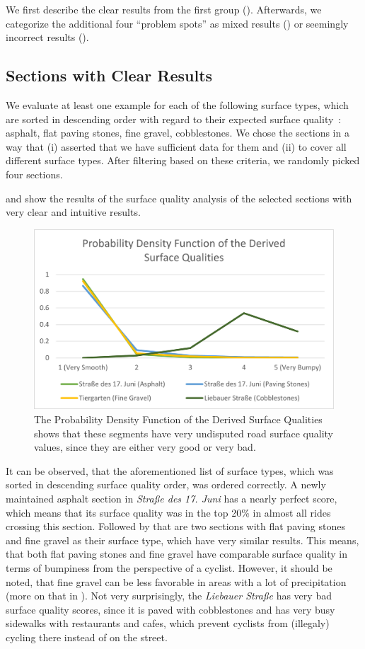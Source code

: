 We first describe the clear results from the first group ().
Afterwards, we categorize the additional four ``problem spots'' as mixed results () or seemingly incorrect results ().


\subsection{Sections with Clear Results}
\label{subsec:sections_with_clear_results}
We evaluate at least one example for each of the following surface types, which are sorted in descending order with regard to their expected surface quality~\cite{titov2019monitoring}: asphalt, flat paving stones, fine gravel, cobblestones.
We chose the sections in a way that (i) asserted that we have sufficient data for them and (ii) to cover all different surface types.
After filtering based on these criteria, we randomly picked four sections.

 and  show the results of the surface quality analysis of the selected sections with very clear and intuitive results.

\begin{figure}
    \centering
    \includegraphics[width=0.7\columnwidth]{fig/pdf_clear.png}
    \caption{%
        The Probability Density Function of the Derived Surface Qualities shows that these segments have very undisputed road surface quality values, since they are either very good or very bad.
    }%
    \label{fig:clear}
\end{figure}

It can be observed, that the aforementioned list of surface types, which was sorted in descending surface quality order, was ordered correctly.
A newly maintained asphalt section in \textit{Straße des 17. Juni} has a nearly perfect score, which means that its surface quality was in the top 20\% in almost all rides crossing this section.
Followed by that are two sections with flat paving stones and fine gravel as their surface type, which have very similar results.
This means, that both flat paving stones and fine gravel have comparable surface quality in terms of bumpiness from the perspective of a cyclist.
However, it should be noted, that fine gravel can be less favorable in areas with a lot of precipitation (more on that in ).
Not very surprisingly, the \textit{Liebauer Straße} has very bad surface quality scores, since it is paved with cobblestones and has very busy sidewalks with restaurants and cafes, which prevent cyclists from (illegaly) cycling there instead of on the street.


